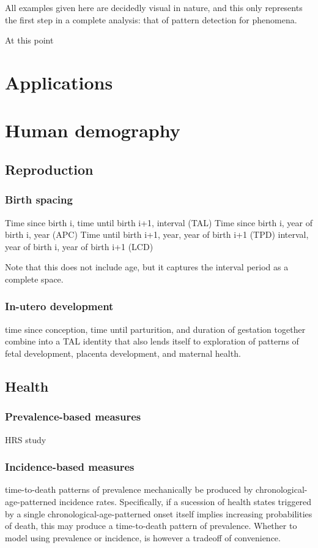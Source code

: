 \documentclass[11pt,oneside]{article} %
\begin{document}
All examples given here are decidedly visual in nature, and this only
represents the first step in a complete analysis: that of pattern detection for
phenomena.

At this point 

\section{Applications}

\section{Human demography}
	\subsection{Reproduction}
		\subsubsection{Birth spacing}
		Time since birth i, time until birth i+1, interval (TAL)
		Time since birth i, year of birth i, year (APC)
		Time until birth i+1, year, year of birth i+1 (TPD)
		interval, year of birth i, year of birth i+1 (LCD)
		
		Note that this does not include age, but it captures the interval period as a
		complete space.
		\subsubsection{In-utero development}
		time since conception, time until parturition, and duration of gestation
		together combine into a TAL identity that also lends itself to exploration of
		patterns of fetal development, placenta development, and maternal health.
	\subsection{Health}
		\subsubsection{Prevalence-based measures}
		HRS study
		\subsubsection{Incidence-based measures}
		time-to-death patterns of prevalence mechanically be produced by
		chronological-age-patterned incidence rates. Specifically, if a sucession of
		health states triggered by a single chronological-age-patterned onset itself
		implies increasing probabilities of death, this may produce a time-to-death
		pattern of prevalence. Whether to model using prevalence or incidence, is
		however a tradeoff of convenience.
\end{document}
